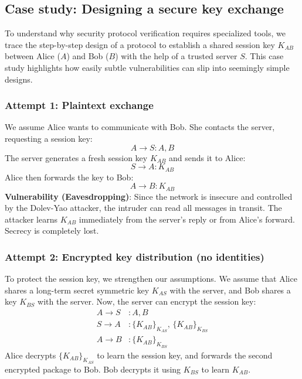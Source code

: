 \subsection{Case study: Designing a secure key exchange}

To understand why security protocol verification requires specialized tools, we trace the step-by-step design of a protocol to establish a shared session key $K_{AB}$ between Alice ($A$) and Bob ($B$) with the help of a trusted server $S$. This case study highlights how easily subtle vulnerabilities can slip into seemingly simple designs.

\subsubsection{Attempt 1: Plaintext exchange}
We assume Alice wants to communicate with Bob. She contacts the server, requesting a session key:
\[
  A \to S : A, B
\]
The server generates a fresh session key $K_{AB}$ and sends it to Alice:
\[
  S \to A : K_{AB}
\]
Alice then forwards the key to Bob:
\[
  A \to B : K_{AB}
\]
\textbf{Vulnerability (Eavesdropping)}: Since the network is insecure and controlled by the Dolev-Yao attacker, the intruder can read all messages in transit. The attacker learns $K_{AB}$ immediately from the server's reply or from Alice's forward. Secrecy is completely lost.

\subsubsection{Attempt 2: Encrypted key distribution (no identities)}
To protect the session key, we strengthen our assumptions. We assume that Alice shares a long-term secret symmetric key $K_{AS}$ with the server, and Bob shares a key $K_{BS}$ with the server. Now, the server can encrypt the session key:
\begin{align*}
  A \to S &: A, B \\
  S \to A &: \{K_{AB}\}_{K_{AS}}, \, \{K_{AB}\}_{K_{BS}} \\
  A \to B &: \{K_{AB}\}_{K_{BS}}
\end{align*}
Alice decrypts $\{K_{AB}\}_{K_{AS}}$ to learn the session key, and forwards the second encrypted package to Bob. Bob decrypts it using $K_{BS}$ to learn $K_{AB}$.

